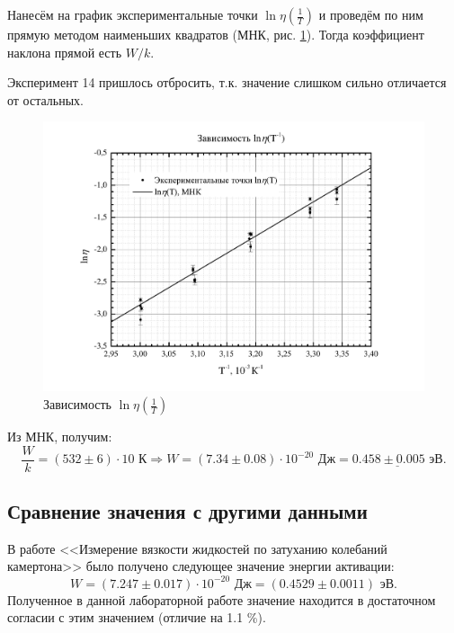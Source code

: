 \documentclass[a4paper,12pt]{article}
\begin{document}
Нанесём на график экспериментальные точки $\ln \eta(\frac{1}{T})$ и проведём по ним прямую методом наименьших квадратов (МНК, рис. \ref{Fig:graph}). Тогда коэффициент наклона прямой есть $W/k$.

Эксперимент 14 пришлось отбросить, т.к. значение слишком сильно отличается от остальных.

\begin{figure}
	\centering
	\includegraphics[width=0.8\linewidth]{graph}
	\caption{Зависимость $\ln \eta(\frac{1}{T})$}
	\label{Fig:graph}
\end{figure}

Из МНК, получим:
\begin{equation}
\frac{W}{k}=(532\pm6)\cdot 10 \text{ К}\Rightarrow W=(7.34\pm0.08)\cdot 10^{-20} \text{ Дж}=\underline{0.458\pm0.005 \text{ эВ}}.
\end{equation}

\subsection{Сравнение значения с другими данными}
В работе <<Измерение вязкости жидкостей по затуханию колебаний камертона>> \cite{Stat:Agafon} было получено следующее значение энергии активации:
$$
W = (7.247\pm0.017)\cdot 10^{-20} \text{ Дж} = (0.4529\pm 0.0011) \text{ эВ}.
$$
Полученное в данной лабораторной работе значение  находится в достаточном согласии с этим значением (отличие на 1.1 \%).
\end{document}
